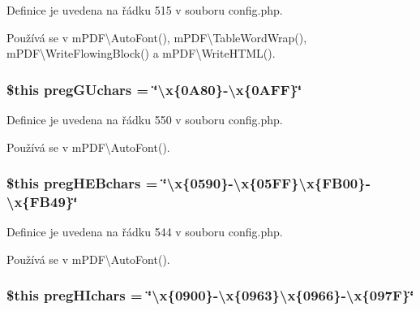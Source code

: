 Definice je uvedena na řádku 515 v souboru config.\-php.



Používá se v m\-P\-D\-F\textbackslash{}\-Auto\-Font(), m\-P\-D\-F\textbackslash{}\-Table\-Word\-Wrap(), m\-P\-D\-F\textbackslash{}\-Write\-Flowing\-Block() a m\-P\-D\-F\textbackslash{}\-Write\-H\-T\-M\-L().

\hypertarget{config_8php_aeb71e95cd3fc9cb0d521cb736f6cc137}{
\subsubsection[{preg\-G\-Uchars}]{\setlength{\rightskip}{0pt plus 5cm}\$this preg\-G\-Uchars = \char`\"{}\textbackslash{}x\{0\-A80\}-\/\textbackslash{}x\{0\-A\-F\-F\}\char`\"{}}}\label{config_8php_aeb71e95cd3fc9cb0d521cb736f6cc137}


Definice je uvedena na řádku 550 v souboru config.\-php.



Používá se v m\-P\-D\-F\textbackslash{}\-Auto\-Font().

\hypertarget{config_8php_a92662e0d06763e04a021074b8e0dccc2}{
\subsubsection[{preg\-H\-E\-Bchars}]{\setlength{\rightskip}{0pt plus 5cm}\$this preg\-H\-E\-Bchars = \char`\"{}\textbackslash{}x\{0590\}-\/\textbackslash{}x\{05\-F\-F\}\textbackslash{}x\{\-F\-B00\}-\/\textbackslash{}x\{\-F\-B49\}\char`\"{}}}\label{config_8php_a92662e0d06763e04a021074b8e0dccc2}


Definice je uvedena na řádku 544 v souboru config.\-php.



Používá se v m\-P\-D\-F\textbackslash{}\-Auto\-Font().

\hypertarget{config_8php_af9d1185f7f9a284b1bb407f220f10912}{
\subsubsection[{preg\-H\-Ichars}]{\setlength{\rightskip}{0pt plus 5cm}\$this preg\-H\-Ichars = \char`\"{}\textbackslash{}x\{0900\}-\/\textbackslash{}x\{0963\}\textbackslash{}x\{0966\}-\/\textbackslash{}x\{097\-F\}\char`\"{}}}\label{config_8php_af9d1185f7f9a284b1bb407f220f10912}


